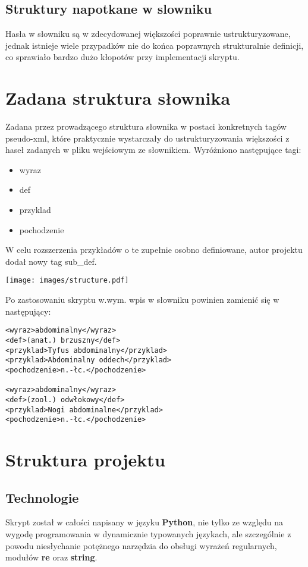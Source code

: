 \documentclass[12pt]{article}
\begin{document}
\subsection{Struktury napotkane w slowniku}
Hasła w słowniku są w zdecydowanej większości poprawnie ustrukturyzowane, jednak
istnieje wiele przypadków nie do końca poprawnych strukturalnie definicji, co 
sprawiało bardzo dużo kłopotów przy implementacji skryptu.

\section{Zadana struktura słownika}
Zadana przez prowadzącego struktura słownika w postaci konkretnych tagów pseudo-xml,
które praktycznie wystarczały do ustrukturyzowania większości z haseł zadanych w pliku
wejściowym ze słownikiem. Wyróżniono następujące tagi:

\begin{itemize}
  \item wyraz
  \item def
  \item przyklad
  \item pochodzenie
\end{itemize}

W celu rozszerzenia przykładów o te zupełnie osobno definiowane, autor projektu dodał
nowy tag sub\_def.\\

\begin{figure*}[h]
  \centerline{
    \texttt{[image: images/structure.pdf]}
  }
\end{figure*}


Po zastosowaniu skryptu w.wym. wpis w słowniku powinien zamienić się w następujący:

\begin{verbatim}
<wyraz>abdominalny</wyraz>
<def>(anat.) brzuszny</def>
<przyklad>Tyfus abdominalny</przyklad>
<przyklad>Abdominalny oddech</przyklad>
<pochodzenie>n.-łc.</pochodzenie>

<wyraz>abdominalny</wyraz>
<def>(zool.) odwłokowy</def>
<przyklad>Nogi abdominalne</przyklad>
<pochodzenie>n.-łc.</pochodzenie>

\end{verbatim}

\section{Struktura projektu}
\subsection{Technologie}
Skrypt został w całości napisany w języku \textbf{Python}, nie tylko ze względu na wygodę programowania
w dynamicznie typowanych językach, ale szczególnie z powodu niesłychanie potężnego narzędzia do obsługi
wyrażeń regularnych, modułów \textbf{re} oraz \textbf{string}.
\end{document}

